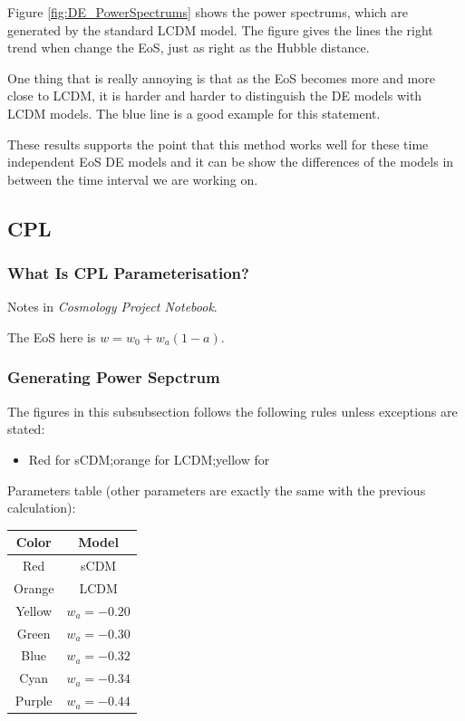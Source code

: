 \documentclass{article}
\begin{document}
Figure \ref{fig:DE_PowerSpectrums} shows the power spectrums, which are generated by the standard LCDM model. The figure gives the lines the right trend when change the EoS, just as right as the Hubble distance.

One thing that is really annoying is that as the EoS becomes more and more close to LCDM, it is harder and harder to distinguish the DE models with LCDM models. The blue line is a good example for this statement.



These results supports the point that this method works well for these time independent EoS DE models and it can be show the differences of the models in between the time interval we are working on.











\subsection{CPL}


\subsubsection{What Is CPL Parameterisation?}

Notes in {\it Cosmology Project Notebook}.

The EoS here is $w=w_0+w_a(1-a)$.

\subsubsection{Generating Power Sepctrum}

The figures in this subsubsection follows the following rules unless exceptions are stated:
\begin{itemize}
\item
Red for sCDM;orange for LCDM;yellow for 

\end{itemize}

Parameters table (other parameters are exactly the same with the previous calculation):

\vspace{2ex}
\begin{center}
\begin{tabular}{|c|c|}\hline
{\bf Color} & {\bf Model} \\\hline
Red & sCDM \\\hline
Orange & LCDM \\\hline
Yellow & $w_a=-0.20$ \\ \hline
Green &  $w_a=-0.30$ \\ \hline
Blue & $w_a=-0.32$ \\ \hline
Cyan & $w_a=-0.34$ \\ \hline
Purple & $w_a=-0.44$ \\ \hline
\end{tabular}
\end{center}
\vspace{2ex}
\end{document}

